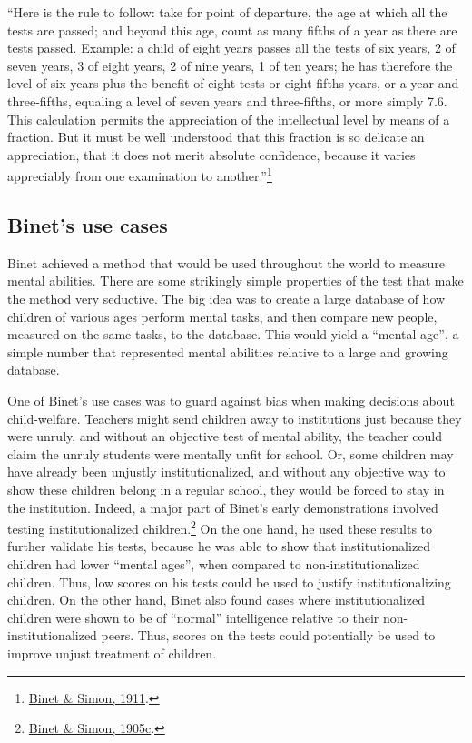 \documentclass[
  oneside,
  12pt]{crumpbook}
\begin{document}
``Here is the rule to follow: take for point of departure, the age at which all the tests are passed; and beyond this age, count as many fifths of a year as there are tests passed. Example: a child of eight years passes all the tests of six years, 2 of seven years, 3 of eight years, 2 of nine years, 1 of ten years; he has therefore the level of six years plus the benefit of eight tests or eight-fifths years, or a year and three-fifths, equaling a level of seven years and three-fifths, or more simply 7.6. This calculation permits the appreciation of the intellectual level by means of a fraction. But it must be well understood that this fraction is so delicate an appreciation, that it does not merit absolute confidence, because it varies appreciably from one examination to another.''\footnote{\protect\hyperlink{ref-binetNewInvestigationsMeasure1911}{Binet \& Simon, 1911}.}

\hypertarget{binets-use-cases}{%
\subsection{Binet's use cases}\label{binets-use-cases}}

Binet achieved a method that would be used throughout the world to measure mental abilities. There are some strikingly simple properties of the test that make the method very seductive. The big idea was to create a large database of how children of various ages perform mental tasks, and then compare new people, measured on the same tasks, to the database. This would yield a ``mental age'', a simple number that represented mental abilities relative to a large and growing database.

One of Binet's use cases was to guard against bias when making decisions about child-welfare. Teachers might send children away to institutions just because they were unruly, and without an objective test of mental ability, the teacher could claim the unruly students were mentally unfit for school. Or, some children may have already been unjustly institutionalized, and without any objective way to show these children belong in a regular school, they would be forced to stay in the institution. Indeed, a major part of Binet's early demonstrations involved testing institutionalized children.\footnote{\protect\hyperlink{ref-binetNecessityEstablishingScientific1905}{Binet \& Simon, 1905c}.} On the one hand, he used these results to further validate his tests, because he was able to show that institutionalized children had lower ``mental ages'', when compared to non-institutionalized children. Thus, low scores on his tests could be used to justify institutionalizing children. On the other hand, Binet also found cases where institutionalized children were shown to be of ``normal'' intelligence relative to their non-institutionalized peers. Thus, scores on the tests could potentially be used to improve unjust treatment of children.
\end{document}
